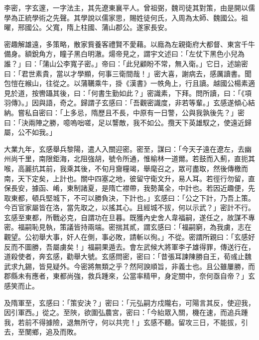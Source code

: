 
\begin{pinyinscope}

 李密，字玄邃，一字法主，其先遼東襄平人。曾祖弼，魏司徒其對策，由是開以儒學為正統學術之先聲。其學說以儒家思，賜姓徒何氏，入周為太師、魏國公。祖曜，邢國公。父寬，隋上柱國、蒲山郡公。遂家長安。



 密趣解雄遠，多策略，散家貲養客禮賢不愛藉。以廕為左親衛府大都督、東宮千牛備身。額銳角方，瞳子黑白明澈。煬帝見之，謂宇文述曰：「左仗下黑色小兒為誰？」曰：「蒲山公李寬子密。」帝曰：「此兒顧盼不常，無入衛。」它日，述諭密曰：「君世素貴，當以才學顯，何事三衛間哉！」密大喜，謝病去，感厲讀書。聞包愷在緱山，往從之。以蒲韉乘牛，掛《漢書》一帙角上，行且讀。越國公楊素適見於道，按轡躡其後，曰：「何書生勤如此？」密識素，下拜。問所讀，曰：「《項羽傳》。」因與語，奇之。歸謂子玄感曰：「吾觀密識度，非若等輩。」玄感遂傾心結納。嘗私自密曰：「上多忌，隋歷且不長，中原有一日警，公與我孰後先？」密曰：「決兩陣之勝，噫嗚咄嗟，足以讋敵，我不如公。攬天下英雄馭之，使遠近歸屬，公不如我。」



 大業九年，玄感舉兵黎陽，遣人入關迎密。密至，謀曰：「今天子遠在遼左，去幽州尚千里，南限鉅海，北阻強胡，號令所通，惟榆林一道爾。若鼓而入薊，直扼其喉，高麗抗其前，我乘其後，不旬月齎糧竭，舉麾召之，眾可盡取，然後傳檄而南，天下定矣，上計也。關中四塞之地，彼留守衛文升，易人耳。若徑行勿留，直保長安，據函、崤，東制諸夏，是隋亡襟帶，我勢萬全，中計也。若因近趣便，先取東都，頓兵堅城下，不可以勝負決，下計也。」玄感曰：「公之下計，乃吾上策。今百官家屬皆在洛，當先取之，以搖其心。且經城不拔，何以示武？」密計不行。玄感至東都，所戰必克，自謂功在旦暮。既獲內史舍人韋福嗣，遂任之，故謀不專密。福嗣恥見執，策議皆持兩端。密揣其貳，謂玄感曰：「福嗣窮，為我虜，志在觀望。公初舉大事，奸人在側，事必敗，請斬以徇。」不從。密謂所親曰：「玄感好反而不圖勝，吾屬虜矣！」福嗣果遁去。會左武候大將軍李子雄得罪，傳送行在，道殺使者，奔玄感，勸舉大號。玄感問密，密曰：「昔張耳諫陳勝自王，荀彧止魏武求九錫，皆見疑外。今密將無類之乎？然阿諛順旨，非義士也。且公雖屢勝，而郡縣未有應者，東都尚強，救兵踵來，公當率精甲，身定關中，奈何亟自帝？」玄感笑而止。



 及隋軍至，玄感曰：「策安決？」密曰：「元弘嗣方戍隴右，可陽言其反，使迎我，因引軍西。」從之。至陜，欲圍弘農宮，密曰：「今紿眾入關，機在速，而追兵踵我，若前不得據險，退無所守，何以共完！」玄感不聽。留攻三日，不能拔，引去，至閺鄉，追及而敗。




\end{pinyinscope}
